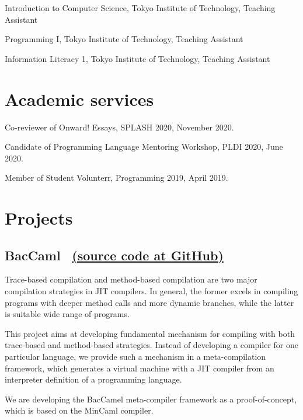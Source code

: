 \documentclass[11pt]{article} %
\newcommand{\伊澤侑祐}{\underline{伊澤侑祐}}
\newcommand{\jit}{\textsc{JIT} }
\begin{document}
 Introduction to Computer Science, Tokyo Institute of Technology, Teaching Assistant

 Programming I, Tokyo Institute of Technology, Teaching Assistant

 Information Literacy 1, Tokyo Institute of Technology, Teaching Assistant


\section*{Academic services}

 Co-reviewer of Onward! Essays, SPLASH 2020, November 2020.

 Candidate of Programming Language Mentoring Workshop, PLDI 2020, June 2020.

 Member of Student Volunterr, Programming 2019, April 2019.

\section*{Projects}

\subsection*{BacCaml \, \href{https://github.com/prg-titech/baccaml}{(source code at GitHub)}}

\medskip

Trace-based compilation and method-based compilation are two major compilation
strategies in \jit compilers. In general, the former excels in  compiling
programs with deeper method calls and more dynamic branches, while  the latter
is suitable wide range of programs.

\medskip

This project aims at developing fundamental mechanism for compiling with both
trace-based and method-based strategies. Instead of developing  a compiler for
one particular language, we provide such a mechanism in a meta-compilation
framework, which generates a virtual machine with a \jit compiler from an
interpreter definition of a programming language.

\medskip

We are developing the BacCamel meta-compiler framework as a proof-of-concept,
which is based on the MinCaml compiler.
\end{document}
